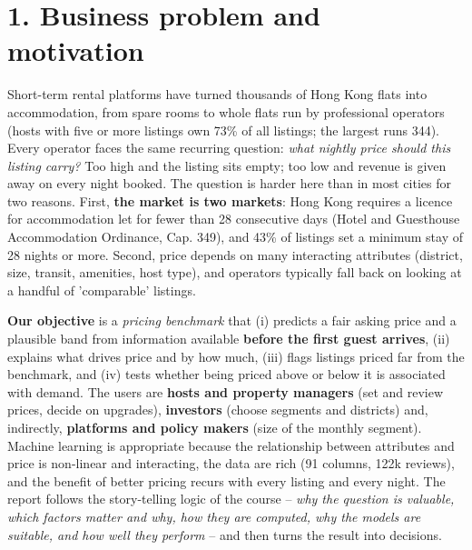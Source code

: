 \documentclass[10pt,a4paper]{article}
\begin{document}
\section*{1. Business problem and motivation}
{Short-term rental platforms have turned thousands of Hong Kong flats into accommodation, from spare rooms to whole flats run by professional operators (hosts with five or more listings own 73\% of all listings; the largest runs 344). Every operator faces the same recurring question: \textit{what nightly price should this listing carry?} Too high and the listing sits empty; too low and revenue is given away on every night booked. The question is harder here than in most cities for two reasons. First, \textbf{the market is two markets}: Hong Kong requires a licence for accommodation let for fewer than 28 consecutive days (Hotel and Guesthouse Accommodation Ordinance, Cap. 349), and 43\% of listings set a minimum stay of 28 nights or more. Second, price depends on many interacting attributes (district, size, transit, amenities, host type), and operators typically fall back on looking at a handful of 'comparable' listings.\par}
{\textbf{Our objective} is a \textit{pricing benchmark} that (i) predicts a fair asking price and a plausible band from information available \textbf{before the first guest arrives}, (ii) explains what drives price and by how much, (iii) flags listings priced far from the benchmark, and (iv) tests whether being priced above or below it is associated with demand. The users are \textbf{hosts and property managers} (set and review prices, decide on upgrades), \textbf{investors} (choose segments and districts) and, indirectly, \textbf{platforms and policy makers} (size of the monthly segment). Machine learning is appropriate because the relationship between attributes and price is non-linear and interacting, the data are rich (91 columns, 122k reviews), and the benefit of better pricing recurs with every listing and every night. The report follows the story-telling logic of the course -- \textit{why the question is valuable, which factors matter and why, how they are computed, why the models are suitable, and how well they perform} -- and then turns the result into decisions.\par}
\end{document}
